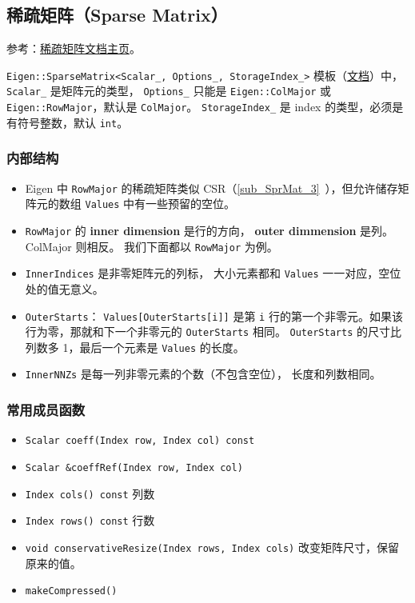 \subsection{稀疏矩阵（Sparse Matrix）}

参考：\href{https://eigen.tuxfamily.org/dox/group__TutorialSparse.html}{稀疏矩阵文档主页}。

\verb|Eigen::SparseMatrix<Scalar_, Options_, StorageIndex_>| 模板（\href{https://eigen.tuxfamily.org/dox/classEigen_1_1SparseMatrix.html#a03de8b3da2c142ce8698a76123b3e7d3}{文档}）中，\verb|Scalar_| 是矩阵元的类型， \verb|Options_| 只能是 \verb|Eigen::ColMajor| 或 \verb|Eigen::RowMajor|，默认是 \verb|ColMajor|。 \verb|StorageIndex_| 是 index 的类型，必须是有符号整数，默认 \verb|int|。

\subsubsection{内部结构}
\begin{itemize}
\item Eigen 中 \verb|RowMajor| 的稀疏矩阵类似 CSR（\autoref{sub_SprMat_3}~），但允许储存矩阵元的数组 \verb|Values| 中有一些预留的空位。
\item \verb|RowMajor| 的 \textbf{inner dimension} 是行的方向， \textbf{outer dimmension} 是列。 ColMajor 则相反。 我们下面都以 \verb|RowMajor| 为例。
\item \verb|InnerIndices| 是非零矩阵元的列标， 大小元素都和 \verb|Values| 一一对应，空位处的值无意义。
\item \verb|OuterStarts|： \verb|Values[OuterStarts[i]]| 是第 \verb|i| 行的第一个非零元。如果该行为零，那就和下一个非零元的 \verb|OuterStarts| 相同。 \verb|OuterStarts| 的尺寸比列数多 1，最后一个元素是 \verb|Values| 的长度。
\item \verb|InnerNNZs| 是每一列非零元素的个数（不包含空位）， 长度和列数相同。
\end{itemize}

\subsubsection{常用成员函数}
\begin{itemize}
\item \verb|Scalar coeff(Index row, Index col) const|
\item \verb|Scalar &coeffRef(Index row, Index col)|
\item \verb|Index cols() const| 列数
\item \verb|Index rows() const| 行数
\item \verb|void conservativeResize(Index rows, Index cols)| 改变矩阵尺寸，保留原来的值。
\item \verb|makeCompressed()|
\end{itemize}
